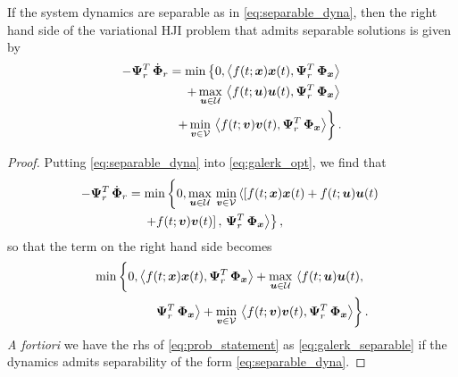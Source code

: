 \begin{theorem}
	If the system dynamics are separable as in \eqref{eq:separable_dyna}, then the right hand side of the variational HJI problem that admits separable solutions is given by
	\begin{equation}
		\begin{split}
-\bm{\Psi}_r^T \, \dot{\bm{\Phi}}_r =
			\min \left\{0,\left\langle f(t; {\bm{x}}) \bm{x}(t),   \bm{\Psi}_r^T \, \bm{\Phi}_{\bm{x}} \right\rangle 
		\right. \\
		\left.
		+ \max_{\bm{u} \in \mathcal{U}} \, \left\langle f(t; \bm{u}) \bm{u}(t), \bm{\Psi}_r^T \, \bm{\Phi}_{\bm{x}} \right\rangle 
		\right. \\ 
		\left.  
		+ \min_{\bm{v} \in \mathcal{V}}\, \left\langle   f(t; \bm{v}) \bm{v}(t),  \bm{\Psi}_r^T \, \bm{\Phi}_{\bm{x}} \right\rangle \right\}.
		\end{split}
	\end{equation}
\label{th:separable}
\end{theorem}

\begin{proof}
Putting \eqref{eq:separable_dyna} into \eqref{eq:galerk_opt}, we find that
%
\begin{align}
	\begin{split}
		-\bm{\Psi}_r^T \, \dot{\bm{\Phi}}_r  &= \min \left\{0, \max_{\bm{u} \in \mathcal{U}} \, \min_{\bm{v} \in \mathcal{V}} \left\langle \left[f(t; {\bm{x}}) \bm{x}(t) + f(t; \bm{u}) \bm{u}(t) \right. \right. \right. \\
		& \quad   \left. \left. \left. + f(t; \bm{v}) \bm{v}(t) \right],   \, \bm{\Psi}_r^T \, \bm{\Phi}_{\bm{x}}  \right\rangle \right\},
	\end{split}
\end{align}
%
so that the term on the right hand side becomes
%
\begin{align}
	\begin{split}
		\min \left\{0,\left\langle f(t; {\state}) \state(t),   \hilbertcoeffspace_r^T \, \hilbertparamspace_{\state} \right\rangle
		+ \max_{\control \in \mathcal{U}} \, \left\langle f(t; \control) \control(t), \right. \right. \\ 
		\left. \left.  \hilbertcoeffspace_r^T \, \hilbertparamspace_{\state} \right\rangle 
		+ \min_{\disturb \in \mathcal{V}}\, \left\langle   f(t; \disturb) \disturb(t),  \hilbertcoeffspace_r^T \, \hilbertparamspace_{\state} \right\rangle \right\}.
	\end{split}
	  \label{eq:galerk_separable}
\end{align}
%
\textit{A fortiori} we have the rhs of \eqref{eq:prob_statement} as \eqref{eq:galerk_separable} if the dynamics admits separability of the form \eqref{eq:separable_dyna}.
\end{proof}
%

